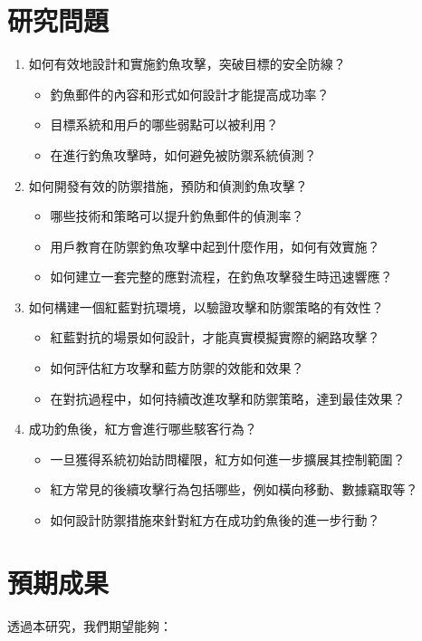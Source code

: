 \documentclass[a4paper,12pt]{article}
\begin{document}
\section{研究問題}
\begin{enumerate}
  \item 如何有效地設計和實施釣魚攻擊，突破目標的安全防線？
    \begin{itemize}
      \item 釣魚郵件的內容和形式如何設計才能提高成功率？
      \item 目標系統和用戶的哪些弱點可以被利用？
      \item 在進行釣魚攻擊時，如何避免被防禦系統偵測？
    \end{itemize}
  \item 如何開發有效的防禦措施，預防和偵測釣魚攻擊？
    \begin{itemize}
      \item 哪些技術和策略可以提升釣魚郵件的偵測率？
      \item 用戶教育在防禦釣魚攻擊中起到什麼作用，如何有效實施？
      \item 如何建立一套完整的應對流程，在釣魚攻擊發生時迅速響應？
    \end{itemize}
  \item 如何構建一個紅藍對抗環境，以驗證攻擊和防禦策略的有效性？
    \begin{itemize}
      \item 紅藍對抗的場景如何設計，才能真實模擬實際的網路攻擊？
      \item 如何評估紅方攻擊和藍方防禦的效能和效果？
      \item 在對抗過程中，如何持續改進攻擊和防禦策略，達到最佳效果？
    \end{itemize}
  \item 成功釣魚後，紅方會進行哪些駭客行為？
    \begin{itemize}
      \item 一旦獲得系統初始訪問權限，紅方如何進一步擴展其控制範圍？
      \item 紅方常見的後續攻擊行為包括哪些，例如橫向移動、數據竊取等？
      \item 如何設計防禦措施來針對紅方在成功釣魚後的進一步行動？
    \end{itemize}
\end{enumerate}

\section{預期成果}
透過本研究，我們期望能夠：
\end{document}
